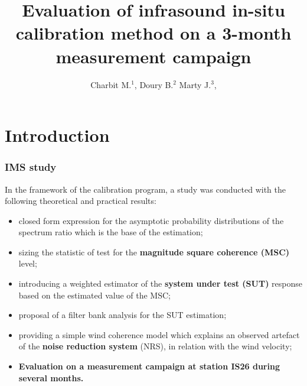 \documentclass[handout,9pt]{beamer}
\title{Evaluation of infrasound in-situ calibration method on a 3-month measurement campaign}
\author{
 Charbit M.$^{1}$, 
 Doury B.$^{2}$
 Marty J.$^{3}$,
}
\begin{document}
 \sloppy

\begin{frame}
\maketitle
\end{frame}


 \section{Introduction}
\begin{frame}
 \frametitle{IMS study}
 In the framework of the calibration program, a study was conducted 
 with the following theoretical and practical results:
 \begin{itemize}
 \item
 closed form expression for the asymptotic probability distributions of the spectrum ratio which is the base of the estimation;
 \item
 sizing the statistic of test for the {\bf  magnitude square coherence (MSC)} level;
 \item
 introducing a weighted estimator of the {\bf system under test (SUT)} response based on the estimated value of 
the MSC;
 \item
 proposal of a filter bank analysis for the SUT estimation;
 \item
 providing a simple wind coherence model which explains an observed artefact of the {\bf noise reduction system} (NRS), in relation with the wind velocity;
 \item
{\bf \color{red} Evaluation on a measurement campaign at station IS26 during several months.}
 \end{itemize}
 
 
\end{frame}
\end{document}
